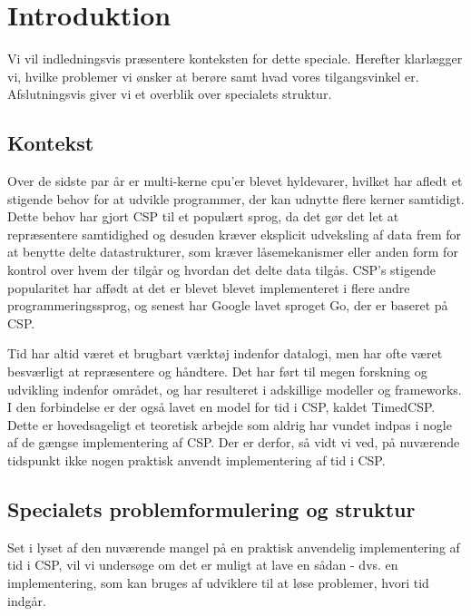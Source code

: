 \chapter{Introduktion}
\thispagestyle{empty}
Vi vil indledningsvis præsentere konteksten for dette speciale. Herefter klarlægger vi, hvilke problemer vi ønsker at berøre samt hvad vores tilgangsvinkel er. Afslutningsvis giver vi et overblik over specialets struktur. 

\section{Kontekst}
Over de sidste par år er multi-kerne cpu'er blevet hyldevarer, hvilket har afledt et stigende behov for at udvikle programmer, der kan udnytte flere kerner samtidigt. Dette behov har gjort CSP til et populært sprog, da det gør det let at repræsentere samtidighed og desuden kræver eksplicit udveksling af data frem for at benytte delte datastrukturer, som kræver låsemekanismer eller anden form for kontrol over hvem der tilgår og hvordan det delte data tilgås. CSP's stigende popularitet har affødt at det er blevet blevet implementeret i flere andre programmeringssprog, og senest har Google lavet sproget Go, der er baseret på CSP. 

Tid har altid været et brugbart værktøj indenfor datalogi, men har ofte været besværligt at repræsentere og håndtere. Det har ført til megen forskning og udvikling indenfor området, og har resulteret i adskillige modeller og frameworks. I den forbindelse er der også lavet en model for tid i CSP, kaldet TimedCSP. Dette er hovedsageligt et teoretisk arbejde som aldrig har vundet indpas i nogle af de gængse implementering af CSP. Der er derfor, så vidt vi ved, på nuværende tidspunkt ikke nogen praktisk anvendt implementering af tid i CSP. 

\section{Specialets problemformulering og struktur}
Set i lyset af den nuværende mangel på en praktisk anvendelig implementering af tid i CSP, vil vi undersøge om det er muligt at lave en sådan - dvs. en implementering, som kan bruges af udviklere til at løse problemer, hvori tid indgår.


